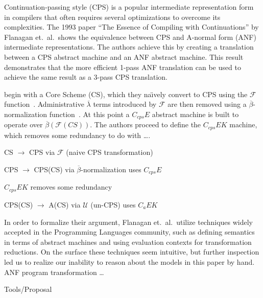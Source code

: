 \documentclass[11pt]{article}
\begin{document}
\thispagestyle{fancy}


Continuation-passing style (CPS) is a popular intermediate representation form
in compilers that often requires several optimizations to overcome its
complexities. The 1993 paper ``The Essence of Compiling with Continuations''
by Flanagan et.\ al.\ shows the equivalence between CPS and A-normal form (ANF)
intermediate representations. The authors achieve this by creating a
translation between a CPS abstract machine and an ANF abstract machine. This
result demonstrates that the more efficient 1-pass ANF translation can be
used to achieve the same result as a 3-pass CPS translation.

\citet{Flanagan:1993fk} begin with a Core Scheme (CS), which they na\"{\i}vely
convert to CPS using the $\mathcal{F}$ function~\cite{Fischer:1993ys}.
Administrative $\overline{\lambda}$ terms introduced by $\mathcal{F}$ are then
removed using a $\overline{\beta}$-normalization function~\cite{Sabry:1992zr}.
At this point a $C_{cps}E$ abstract machine is built to operate over
$\overline{\beta}(\mathcal{F}(\textit{CS}))$. The authors proceed to define the
$C_{cps}EK$ machine, which removes some redundancy to do with \ldots.

CS $\to$ CPS via $\mathcal{F}$ (naive CPS transformation) 

CPS $\to$ CPS(CS) via $\overline{\beta}$-normalization uses $C_{cps}E$

$C_{cps}EK$ removes some redundancy

CPS(CS) $\to$ A(CS) via $\mathcal{U}$ (un-CPS) uses $C_{a}EK$

In order to formalize their argument, Flanagan et.\ al.\ utilize techniques
widely accepted in the Programming Languages community, such as defining
semantics in terms of abstract machines and using evaluation contexts for
transformation reductions. On the surface these techniques seem intuitive, but
further inspection led us to realize our inability to reason about the models
in this paper by hand. ANF program transformation \ldots

Tools/Proposal



\end{document}
